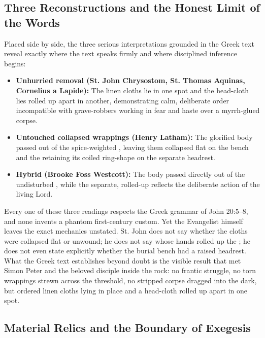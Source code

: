 \subsection{Three Reconstructions and the Honest Limit of the Words}

Placed side by side, the three serious interpretations grounded in the Greek text reveal exactly where the text speaks firmly and where disciplined inference begins:

\begin{itemize}
\item \textbf{Unhurried removal (St. John Chrysostom, St. Thomas Aquinas, Cornelius a Lapide):} The linen cloths lie in one spot and the head-cloth lies rolled up apart in another, demonstrating calm, deliberate order incompatible with grave-robbers working in fear and haste over a myrrh-glued corpse.
\item \textbf{Untouched collapsed wrappings (Henry Latham):} The glorified body passed out of the spice-weighted , leaving them collapsed flat on the bench and the  retaining its coiled ring-shape on the separate headrest.
\item \textbf{Hybrid (Brooke Foss Westcott):} The body passed directly out of the undisturbed , while the separate, rolled-up  reflects the deliberate action of the living Lord.
\end{itemize}

Every one of these three readings respects the Greek grammar of John 20:5--8, and none invents a phantom first-century custom. Yet the Evangelist himself leaves the exact mechanics unstated. St. John does not say whether the cloths were collapsed flat or unwound; he does not say whose hands rolled up the ; he does not even state explicitly whether the burial bench had a raised headrest. What the Greek text establishes beyond doubt is the visible result that met Simon Peter and the beloved disciple inside the rock: no frantic struggle, no torn wrappings strewn across the threshold, no stripped corpse dragged into the dark, but ordered linen cloths lying in place and a head-cloth rolled up apart in one spot.

\subsection{Material Relics and the Boundary of Exegesis}


